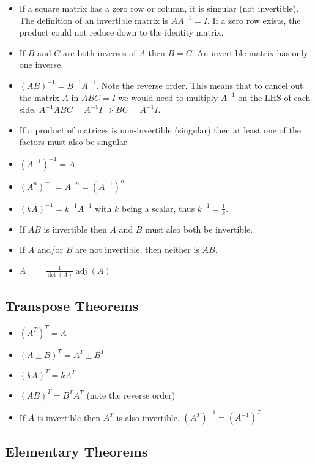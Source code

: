 \documentclass[12pt]{article}
\DeclareMathOperator{\adj}{adj}
\begin{document}
\begin{itemize}
    \item If a square matrix has a zero row or column, it is singular (not invertible). The definition of an invertible matrix is $AA^{-1} = I$. If a zero row exists, the product could not reduce down to the identity matrix.
    \item If $B$ and $C$ are both inverses of $A$ then $B = C$. An invertible matrix has only one inverse.
    \item $(AB)^{-1} = B^{-1}A^{-1}$. Note the reverse order. This means that to cancel out the matrix $A$ in $ABC = I$ we would need to multiply $A^{-1}$ on the LHS of each side. $A^{-1}ABC = A^{-1}I \Rightarrow BC = A^{-1}I$.
    \item If a product of matrices is non-invertible (singular) then at least one of the factors must also be singular.
    \item $(A^{-1})^{-1} = A$
    \item $(A^n)^{-1} = A^{-n} = (A^{-1})^n$
    \item $(kA)^{-1} = k^{-1}A^{-1}$ with $k$ being a scalar, thus $k^{-1} = \frac{1}{k}$.
    \item If $AB$ is invertible then $A$ and $B$ must also both be invertible.
    \item If $A$ and/or $B$ are not invertible, then neither is $AB$.
    \item $A^{-1} = \frac{1}{\det(A)} \adj(A)$
\end{itemize}


\subsection{Transpose Theorems}

\begin{itemize}
    \item $(A^T)^T = A$
    \item $(A \pm B)^T = A^T \pm B^T$
    \item $(kA)^T = kA^T$
    \item $(AB)^T = B^TA^T$ (note the reverse order)
    \item If $A$ is invertible then $A^T$ is also invertible. $(A^T)^{-1} = (A^{-1})^T$.
\end{itemize}


\subsection{Elementary Theorems}
\end{document}
